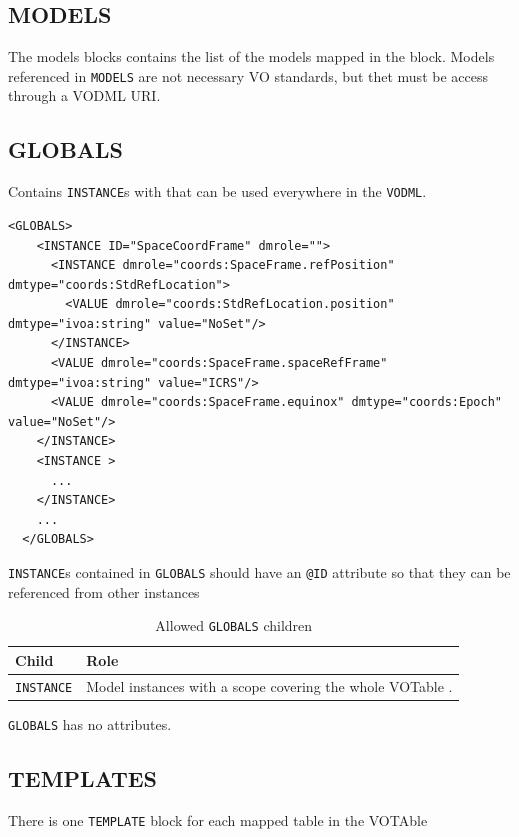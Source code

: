 \documentclass[11pt,a4paper]{ivoa}
\begin{document}
\subsection{MODELS}

The models blocks contains the list of the models mapped in the block. Models referenced in \texttt{MODELS} are not necessary VO standards, but thet must be access through a VODML URI.

\subsection{GLOBALS}

Contains  \texttt{INSTANCE}s with that can be used everywhere in the \texttt{VODML}.


\begin{lstlisting}[caption={INSTANCE bloc example},captionpos=b]
  <GLOBALS>
    <INSTANCE ID="SpaceCoordFrame" dmrole="">
      <INSTANCE dmrole="coords:SpaceFrame.refPosition" dmtype="coords:StdRefLocation">
        <VALUE dmrole="coords:StdRefLocation.position" dmtype="ivoa:string" value="NoSet"/>
      </INSTANCE>
      <VALUE dmrole="coords:SpaceFrame.spaceRefFrame" dmtype="ivoa:string" value="ICRS"/>
      <VALUE dmrole="coords:SpaceFrame.equinox" dmtype="coords:Epoch" value="NoSet"/>
    </INSTANCE>
    <INSTANCE >
      ... 
    </INSTANCE>
    ...
  </GLOBALS>
\end{lstlisting}

\texttt{INSTANCE}s contained in \texttt{GLOBALS} should have an  \texttt{@ID} attribute so that they can be referenced from other instances


\begin{table}[ht!]
     \begin{tabular}{|p{3cm}|p{7cm}|}
       \hline Child &  Role\\
       \hline  \texttt{INSTANCE}    &  Model instances with a scope covering the whole VOTable . \\       
       \hline 
     \end{tabular}
     \caption{Allowed  \texttt{GLOBALS} children} 
 \end{table}

 \texttt{GLOBALS} has no attributes. 


\subsection{TEMPLATES}

There is one \texttt{TEMPLATE} block for each mapped table in the VOTAble 
\end{document}
